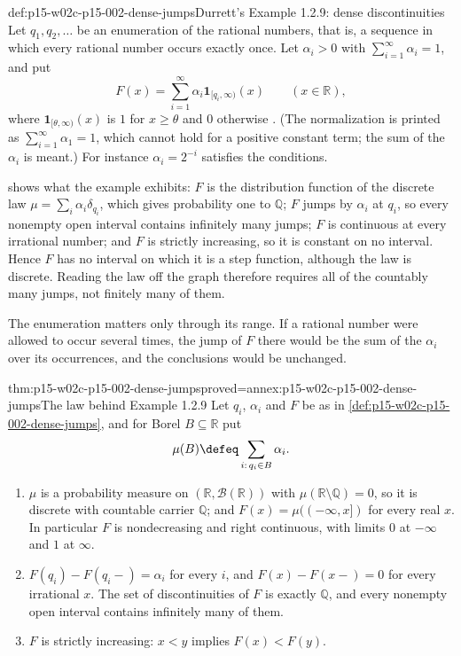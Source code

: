 \begin{hbexample}{def:p15-w02c-p15-002-dense-jumps}{Durrett's Example 1.2.9: dense discontinuities}
Let \(q_1,q_2,\ldots\) be an enumeration of the rational numbers, that is,
a sequence in which every rational number occurs exactly once. Let
\(\alpha_i>0\) with \(\sum_{i=1}^\infty\alpha_i=1\), and put
\[
 F(x)=\sum_{i=1}^\infty\alpha_i\mathbf1_{[q_i,\infty)}(x)
 \qquad(x\in\mathbb R),
\]
where \(\mathbf1_{[\theta,\infty)}(x)\) is \(1\) for \(x\geq\theta\) and
\(0\) otherwise \cite[Example~1.2.9, p.~14]{DurrettPTEAuthor2019}. (The
normalization is printed as \(\sum_{i=1}^\infty\alpha_1=1\), which cannot
hold for a positive constant term; the sum of the \(\alpha_i\) is meant.)
For instance \(\alpha_i=2^{-i}\) satisfies the conditions.

 shows what the example exhibits:
\(F\) is the distribution function of the discrete law
\(\mu=\sum_i\alpha_i\delta_{q_i}\), which gives probability one to
\(\mathbb Q\); \(F\) jumps by \(\alpha_i\) at \(q_i\), so every nonempty
open interval contains infinitely many jumps; \(F\) is continuous at every
irrational number; and \(F\) is strictly increasing, so it is constant on
no interval. Hence \(F\) has no interval on which it is a step function,
although the law is discrete. Reading the law off the graph therefore
requires all of the countably many jumps, not finitely many of them.

The enumeration matters only through its range. If a rational number were
allowed to occur several times, the jump of \(F\) there would be the sum of
the \(\alpha_i\) over its occurrences, and the conclusions would be
unchanged.
\end{hbexample}

\begin{hblemma}{thm:p15-w02c-p15-002-dense-jumps}{proved=annex:p15-w02c-p15-002-dense-jumps}{The law behind Example 1.2.9}
Let \(q_i\), \(\alpha_i\) and \(F\) be as in
\cref{def:p15-w02c-p15-002-dense-jumps}, and for Borel \(B\subseteq\mathbb R\)
put
\[
 \mu(B)\defeq\sum_{i:\,q_i\in B}\alpha_i .
\]
\begin{enumerate}
\item \(\mu\) is a probability measure on \((\mathbb R,\mathcal B(\mathbb R))\)
      with \(\mu(\mathbb R\setminus\mathbb Q)=0\), so it is discrete with
      countable carrier \(\mathbb Q\); and
      \(F(x)=\mu((-\infty,x])\) for every real \(x\). In particular \(F\) is
      nondecreasing and right continuous, with limits \(0\) at \(-\infty\)
      and \(1\) at \(\infty\).
\item \(F(q_i)-F(q_i-)=\alpha_i\) for every \(i\), and
      \(F(x)-F(x-)=0\) for every irrational \(x\). The set of
      discontinuities of \(F\) is exactly \(\mathbb Q\), and every nonempty
      open interval contains infinitely many of them.
\item \(F\) is strictly increasing: \(x<y\) implies \(F(x)<F(y)\).
\end{enumerate}
\end{hblemma}

